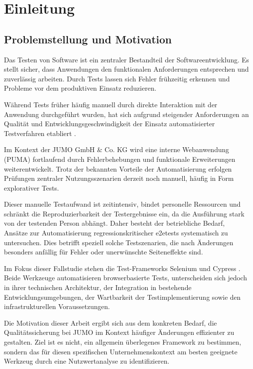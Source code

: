 \section{Einleitung}

\subsection{Problemstellung und Motivation}
Das Testen von Software ist ein zentraler Bestandteil der Softwareentwicklung. Es stellt sicher, dass Anwendungen den funktionalen Anforderungen entsprechen und zuverlässig arbeiten. Durch Tests lassen sich Fehler frühzeitig erkennen und Probleme vor dem produktiven Einsatz reduzieren.

Während Tests früher häufig manuell durch direkte Interaktion mit der Anwendung durchgeführt wurden, hat sich aufgrund steigender Anforderungen an Qualität und Entwicklungsgeschwindigkeit der Einsatz automatisierter Testverfahren etabliert \cite{spillner2024basiswissen}. 

Im Kontext der JUMO GmbH \& Co. KG wird eine interne Webanwendung (PUMA) fortlaufend durch Fehlerbehebungen und funktionale Erweiterungen weiterentwickelt. Trotz der bekannten Vorteile der Automatisierung erfolgen Prüfungen zentraler Nutzungsszenarien derzeit noch manuell, häufig in Form explorativer Tests.

Dieser manuelle Testaufwand ist zeitintensiv, bindet personelle Ressourcen und schränkt die Reproduzierbarkeit der Testergebnisse ein, da die Ausführung stark von der testenden Person abhängt. Daher besteht der betriebliche Bedarf, Ansätze zur Automatisierung regressionskritischer \gls{e2etests} systematisch zu untersuchen. Dies betrifft speziell solche Testszenarien, die nach Änderungen besonders anfällig für Fehler oder unerwünschte Seiteneffekte sind.

Im Fokus dieser Fallstudie stehen die Test-Frameworks Selenium \cite{Selenium} und Cypress \cite{Cypress}. Beide Werkzeuge automatisieren browserbasierte Tests, unterscheiden sich jedoch in ihrer technischen Architektur, der Integration in bestehende Entwicklungsumgebungen, der Wartbarkeit der Testimplementierung sowie den infrastrukturellen Voraussetzungen.

Die Motivation dieser Arbeit ergibt sich aus dem konkreten Bedarf, die Qualitätssicherung bei JUMO im Kontext häufiger Änderungen effizienter zu gestalten. Ziel ist es nicht, ein allgemein überlegenes Framework zu bestimmen, sondern das für diesen spezifischen Unternehmenskontext am besten geeignete Werkzeug durch eine Nutzwertanalyse zu identifizieren.


